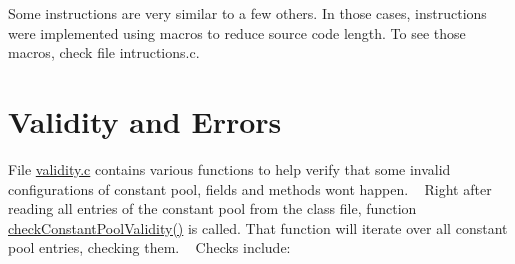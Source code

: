  Some instructions are very similar to a few others. In those cases, instructions were implemented using macros to reduce source code length. To see those macros, check file intructions.\+c.\hypertarget{index_validity}{}\section{Validity and Errors}\label{index_validity}
File \hyperlink{validity_8c}{validity.\+c} contains various functions to help verify that some invalid configurations of constant pool, fields and methods won\textquotesingle{}t happen. ~\newline
 Right after reading all entries of the constant pool from the class file, function \hyperlink{validity_8c_aa0977a766bc0cd47a49ca0e00e706310}{check\+Constant\+Pool\+Validity()} is called. That function will iterate over all constant pool entries, checking them. ~\newline
 Checks include\+:
